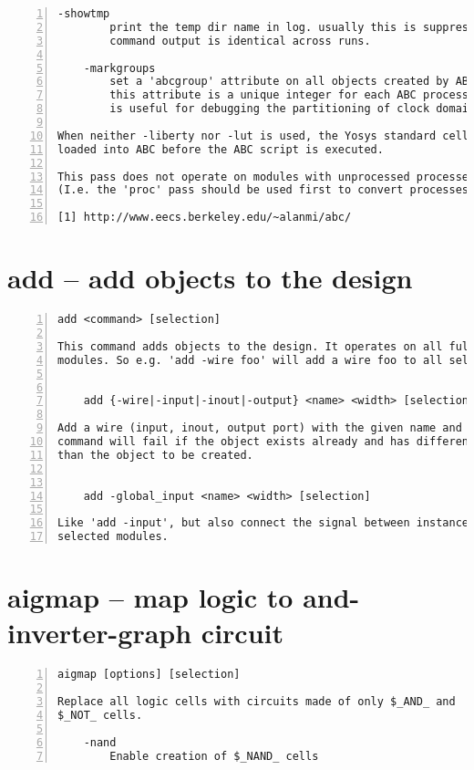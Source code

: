 \begin{lstlisting}[numbers=left,frame=single]
    -showtmp
        print the temp dir name in log. usually this is suppressed so that the
        command output is identical across runs.

    -markgroups
        set a 'abcgroup' attribute on all objects created by ABC. The value of
        this attribute is a unique integer for each ABC process started. This
        is useful for debugging the partitioning of clock domains.

When neither -liberty nor -lut is used, the Yosys standard cell library is
loaded into ABC before the ABC script is executed.

This pass does not operate on modules with unprocessed processes in it.
(I.e. the 'proc' pass should be used first to convert processes to netlists.)

[1] http://www.eecs.berkeley.edu/~alanmi/abc/
\end{lstlisting}

\section{add -- add objects to the design}
\label{cmd:add}
\begin{lstlisting}[numbers=left,frame=single]
    add <command> [selection]

This command adds objects to the design. It operates on all fully selected
modules. So e.g. 'add -wire foo' will add a wire foo to all selected modules.


    add {-wire|-input|-inout|-output} <name> <width> [selection]

Add a wire (input, inout, output port) with the given name and width. The
command will fail if the object exists already and has different properties
than the object to be created.


    add -global_input <name> <width> [selection]

Like 'add -input', but also connect the signal between instances of the
selected modules.
\end{lstlisting}

\section{aigmap -- map logic to and-inverter-graph circuit}
\label{cmd:aigmap}
\begin{lstlisting}[numbers=left,frame=single]
    aigmap [options] [selection]

Replace all logic cells with circuits made of only $_AND_ and
$_NOT_ cells.

    -nand
        Enable creation of $_NAND_ cells
\end{lstlisting}

